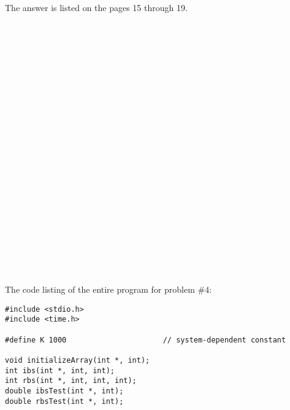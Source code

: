 \documentclass{article}
\begin{document}
		The answer is listed on the pages 15 through 19.
	

\paragraph{}\
\paragraph{}\

\paragraph{}\
\paragraph{}\
\paragraph{}\
\paragraph{}\
\paragraph{}\
\paragraph{}\
\paragraph{}\
\paragraph{}\

		\rmfamily\
		
		\noindent The code listing of the entire program for problem \#4:
		\begin{verbatim}
#include <stdio.h>
#include <time.h>

#define K 1000                      // system-dependent constant

void initializeArray(int *, int);
int ibs(int *, int, int);
int rbs(int *, int, int, int);
double ibsTest(int *, int);
double rbsTest(int *, int);

		\end{verbatim}


\paragraph{}\
\end{document}
